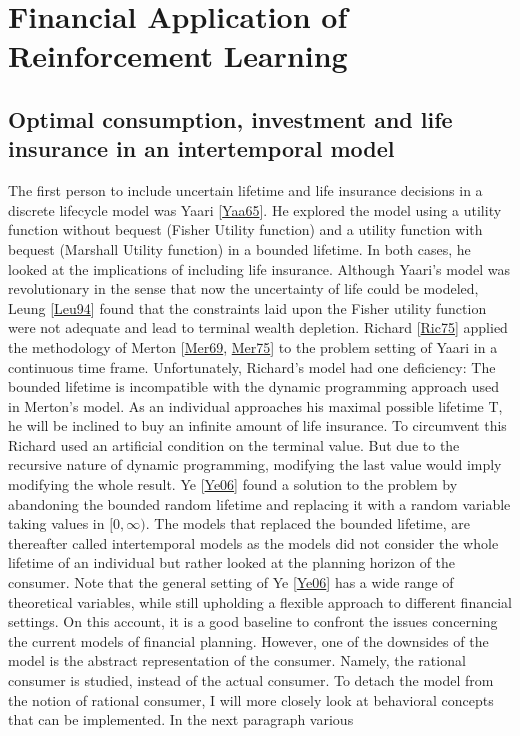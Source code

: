 \documentclass[letterpaper,10pt,english]{jupyterBook}
\begin{document}
\section{Financial Application of Reinforcement Learning}
\label{\detokenize{Financial_application:financial-application-of-reinforcement-learning}}\label{\detokenize{Financial_application::doc}}

\subsection{Optimal consumption, investment and life insurance in an intertemporal model}
\label{\detokenize{Financial_application:optimal-consumption-investment-and-life-insurance-in-an-intertemporal-model}}
\sphinxAtStartPar
The first person to include uncertain lifetime and life insurance decisions in a discrete life\sphinxhyphen{}cycle model was Yaari {[}\hyperlink{cite.Financial_application:id19}{Yaa65}{]}. He explored the model using a utility function without bequest (Fisher Utility function) and a utility function with bequest (Marshall Utility function) in a bounded lifetime. In both cases, he looked at the implications of including life insurance. Although Yaari’s model was revolutionary in the sense that now the uncertainty of life could be modeled, Leung {[}\hyperlink{cite.Financial_application:id23}{Leu94}{]} found that the constraints laid upon the Fisher utility function were not adequate and lead to terminal wealth depletion. Richard {[}\hyperlink{cite.Financial_application:id22}{Ric75}{]} applied the methodology of Merton {[}\hyperlink{cite.Financial_application:id20}{Mer69}, \hyperlink{cite.Financial_application:id21}{Mer75}{]} to the problem setting of Yaari in a continuous time frame. Unfortunately, Richard’s model had one deficiency: The bounded lifetime is incompatible with the dynamic programming approach used in Merton’s model. As an individual approaches his maximal possible lifetime T, he will be inclined to buy an infinite amount of life insurance. To circumvent this Richard used an artificial condition on the terminal value. But due to the recursive nature of dynamic programming, modifying the last value would imply modifying the whole result. Ye {[}\hyperlink{cite.Financial_application:id24}{Ye06}{]}  found a solution to the problem by abandoning the bounded random lifetime and replacing it with a random variable taking values in \([0,\infty)\). The models that replaced the bounded lifetime, are thereafter called intertemporal models as the models did not consider the whole lifetime of an individual but rather looked at the planning horizon of the consumer.  Note that the general setting of Ye {[}\hyperlink{cite.Financial_application:id24}{Ye06}{]} has a wide range of theoretical variables, while still upholding a flexible approach to different financial settings. On this account, it is a good baseline to confront the issues concerning the current models of financial planning. However, one of the downsides of the model is the abstract representation of the consumer. Namely, the rational consumer is studied, instead of the actual consumer. To detach the model from the notion of rational consumer, I will more closely look at behavioral concepts that can be implemented. In the next paragraph various 
\end{document}

